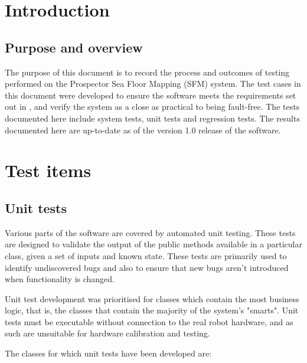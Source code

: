 \documentclass[12pt]{article}
\begin{document}
\clearpage 

\pagebreak
\tableofcontents
\pagebreak


\section{Introduction}

\subsection{Purpose and overview}

The purpose of this document is to record the process and outcomes of testing performed on the Prospector Sea Floor Mapping (SFM) system. The test cases in this document were developed to ensure the software meets the requirements set out in \cite{srs}, and verify the system as a close as practical to being fault-free. The tests documented here include system tests, unit tests and regression tests. The results documented here are up-to-date as of the version 1.0 release of the software.

\section{Test items}

\subsection{Unit tests}

Various parts of the software are covered by automated unit testing. These tests are designed to validate the output of the public methods available in a particular class, given a set of inputs and known state. These tests are primarily used to identify undiscovered bugs and also to ensure that new bugs aren't introduced when functionality is changed.

Unit test development was prioritised for classes which contain the most business logic, that is, the classes that contain the majority of the system's "smarts". Unit tests must be executable without connection to the real robot hardware, and as such are unsuitable for hardware calibration and testing.

The classes for which unit tests have been developed are:
\end{document}
